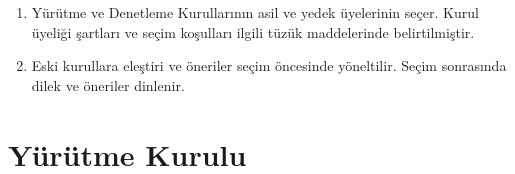 \documentclass[11pt,a4paper]{article}
\begin{document}
\begin{enumerate}
    \begin{itemize}
        \item Tüzük değişikliği ile ilgili önergeler herhangi bir üye tarafından Genel Kurul’dan en az beş gün önce Yürütme Kurulu’na ulaştırılır. Bütün tüzük değişikliği önergeleri Yürütme Kurulu tarafından Genel Kurul’dan en az üç gün önce ilgili yollarla ilan edilir.
        \item Tüzük değişikliği görüşmeleri Genel Kurul gündeminde öncelikli olarak görüşülür.
        \item Tüzük değişikliği için salt oy çoğunluğu aranır.
        \item Yenilenen tüzük, seçilen Yürütme Kurulu tarafından Genel Kurul sonrasında hemen uygulanmaya başlanır ve bir hafta içinde derlenerek duyurulur.
        \item Tüzük değişikliği tartışmaları sırasında öneri, öneri sahibinin de izni alınarak ve genel fikrine ters düşmeyecek şekilde değiştirilebilir.
        \item Yapılan tüzük değişikliğinin ODTÜ tüzük ve yönergeleriyle uyuşmaması durumunda Genel Kurul’dan en geç bir hafta sonraya kadar Akademik Danışman ilgili tüzük değişikliğini iptal edebilir.
    \end{itemize}
    \item Yürütme ve Denetleme Kurullarının asil ve yedek üyelerinin seçer. Kurul üyeliği şartları ve seçim koşulları ilgili tüzük maddelerinde belirtilmiştir.
    \item Eski kurullara eleştiri ve öneriler seçim öncesinde yöneltilir. Seçim sonrasında dilek ve öneriler dinlenir.
\end{enumerate}

\section{Yürütme Kurulu}
\end{document}
